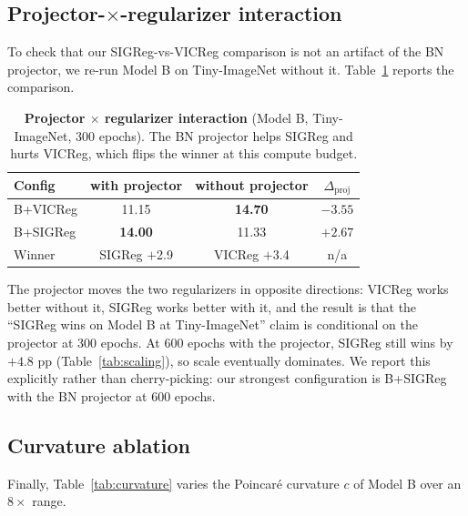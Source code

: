 \documentclass{article}
\begin{document}
\subsection{Projector-$\times$-regularizer interaction}
\label{sec:results:projector}

To check that our SIGReg-vs-VICReg comparison is not an artifact of the BN projector, we re-run Model B on Tiny-ImageNet without it. Table~\ref{tab:projector} reports the comparison.

\begin{table}[t]
  \centering
  \caption{\textbf{Projector $\times$ regularizer interaction} (Model B, Tiny-ImageNet, 300 epochs). The BN projector helps SIGReg and hurts VICReg, which flips the winner at this compute budget.}
  \label{tab:projector}
  \small
  \begin{tabular}{l c c c}
    \toprule
    Config & with projector & without projector & $\Delta_{\text{proj}}$ \\
    \midrule
    B+VICReg & 11.15 & \textbf{14.70} & $-3.55$ \\
    B+SIGReg & \textbf{14.00} & 11.33 & $+2.67$ \\
    \midrule
    Winner & SIGReg $+$2.9 & VICReg $+$3.4 & n/a \\
    \bottomrule
  \end{tabular}
\end{table}

The projector moves the two regularizers in opposite directions: VICReg works better without it, SIGReg works better with it, and the result is that the ``SIGReg wins on Model B at Tiny-ImageNet'' claim is conditional on the projector at 300 epochs. At 600 epochs with the projector, SIGReg still wins by $+4.8$ pp (Table~\ref{tab:scaling}), so scale eventually dominates. We report this explicitly rather than cherry-picking: our strongest configuration is B+SIGReg with the BN projector at 600 epochs.

\subsection{Curvature ablation}
\label{sec:results:curvature}

Finally, Table~\ref{tab:curvature} varies the Poincar\'{e} curvature $c$ of Model B over an $8{\times}$ range.
\end{document}
